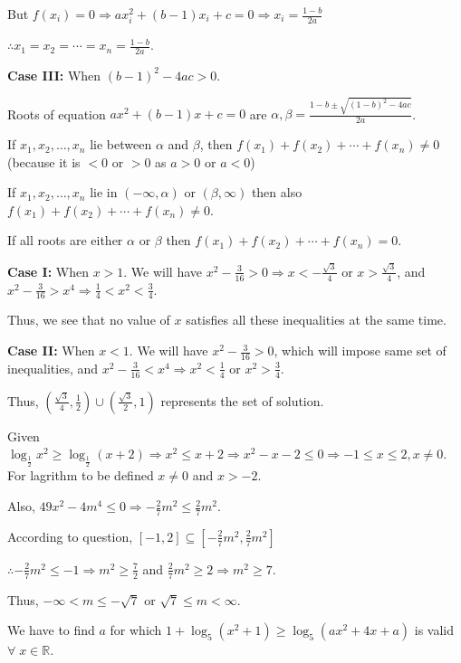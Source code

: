   But $f(x_i) = 0 \Rightarrow ax_i^2 + (b - 1)x_i + c = 0 \Rightarrow x_i = \frac{1 - b}{2a}$

  $\therefore x_1 = x_2 = \cdots = x_n = \frac{1 - b}{2a}$.

  {\bf Case III:} When $(b - 1)^2 - 4ac > 0$.

  Roots of equation $ax^2 + (b - 1)x + c = 0$ are $\alpha,\beta = \frac{1 - b\pm\sqrt{(1 - b)^2 -
      4ac}}{2a}$.

  If $x_1, x_2, \ldots, x_n$ lie between $\alpha$ and $\beta$, then $f(x_1) + f(x_2) + \cdots + f(x_n)\neq
  0$ (because it is $< 0$ or $> 0$ as $a > 0$ or $a < 0$)

  If $x_1, x_2, \ldots, x_n$ lie in $(-\infty, \alpha)$ or $(\beta, \infty)$ then also $f(x_1) + f(x_2) +
  \cdots + f(x_n)\neq 0$.

  If all roots are either $\alpha$ or $\beta$ then $f(x_1) + f(x_2) + \cdots + f(x_n) = 0$.
\item {\bf Case I:} When $x > 1$. We will have $x^2 - \frac{3}{16} > 0 \Rightarrow x < -\frac{\sqrt{3}}{4}$
  or $x > \frac{\sqrt{3}}{4}$, and $x^2 - \frac{3}{16} > x^4 \Rightarrow \frac{1}{4} < x^2 < \frac{3}{4}$.

  Thus, we see that no value of $x$ satisfies all these inequalities at the same time.

  {\bf Case II:} When $x < 1$. We will have $x^2 - \frac{3}{16} > 0$, which will impose same set of
  inequalities, and $x^2 - \frac{3}{16} < x^4 \Rightarrow x^2 < \frac{1}{4}$ or $x^2 > \frac{3}{4}$.

  Thus, $\left(\frac{\sqrt{3}}{4}, \frac{1}{2}\right)\cup\left(\frac{\sqrt{3}}{2}, 1\right)$ represents the
  set of solution.
\item Given $\log_{\tfrac{1}{2}}x^2 \geq \log_{\tfrac{1}{2}}(x + 2)\Rightarrow x^2\leq x + 2 \Rightarrow x^2
  - x - 2\leq 0 \Rightarrow -1 \leq x\leq 2, x\neq 0$. For lagrithm to be defined $x\neq 0$ and $x > -2$.

  Also, $49x^2 - 4m^4 \leq 0 \Rightarrow -\frac{2}{7}m^2\leq \frac{2}{7}m^2$.

  According to question, $[-1, 2]\subseteq \left[-\frac{2}{7}m^2, \frac{2}{7}m^2\right]$

  $\therefore -\frac{2}{7}m^2\leq -1 \Rightarrow m^2\geq \frac{7}{2}$ and $\frac{2}{7}m^2\geq 2 \Rightarrow
  m^2\geq 7$.

  Thus, $-\infty < m \leq -\sqrt{7}$ or $\sqrt{7}\leq m < \infty$.
\item We have to find $a$ for which $1 + \log_5(x^2 + 1) \geq \log_5(ax^2 + 4x + a)$ is valid
  $\forall\;x\in\mathbb{R}$.


